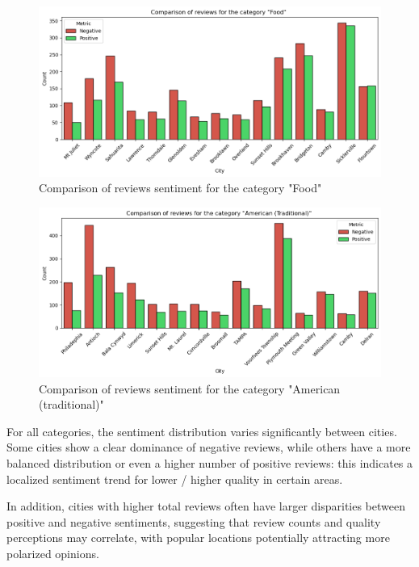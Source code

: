 \documentclass{Configuration_Files/PoliMi3i_thesis}
\begin{document}
\bigskip

\begin{figure}[H]
    \centering
    \includegraphics[width=\columnwidth ]{imgs/query_8b.png}
    \caption{Comparison of reviews sentiment for the category "Food"}
    \label{fig:query_8b}
\end{figure}

\bigskip

\begin{figure}[H]
    \centering
    \includegraphics[width=\columnwidth]{imgs/query_8c.png}
    \caption{Comparison of reviews sentiment for the category "American (traditional)"}
    \label{fig:query_8c}
\end{figure}

\bigskip

For all categories, the sentiment distribution varies significantly between cities. Some cities show a clear dominance of negative reviews, while others have a more balanced distribution or even a higher number of positive reviews: this indicates a localized sentiment trend for lower / higher quality in certain areas.

In addition, cities with higher total reviews often have larger disparities between positive and negative sentiments, suggesting that review counts and quality perceptions may correlate, with popular locations potentially attracting more polarized opinions.
\end{document}
